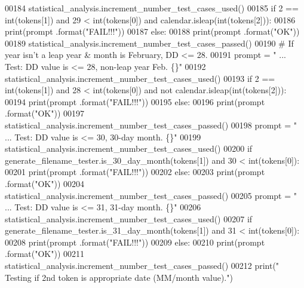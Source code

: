 \begin{DoxyCode}
00184         statistical\_analysis.increment\_number\_test\_cases\_used()
00185         \textcolor{keywordflow}{if} 2 == int(tokens[1]) \textcolor{keywordflow}{and} 29 < int(tokens[0]) \textcolor{keywordflow}{and} calendar.isleap(int(tokens[2])):
00186             print(prompt .format(\textcolor{stringliteral}{"FAIL!!!"}))
00187         \textcolor{keywordflow}{else}:
00188             print(prompt .format(\textcolor{stringliteral}{"OK"}))
00189             statistical\_analysis.increment\_number\_test\_cases\_passed()
00190         \textcolor{comment}{# If year isn't a leap year & month is February, DD <= 28.}
00191         prompt = \textcolor{stringliteral}{"  ... Test: DD value is <= 28, non-leap year Feb.     \{\}"}
00192         statistical\_analysis.increment\_number\_test\_cases\_used()
00193         \textcolor{keywordflow}{if} 2 == int(tokens[1]) \textcolor{keywordflow}{and} 28 < int(tokens[0]) \textcolor{keywordflow}{and} \textcolor{keywordflow}{not} calendar.isleap(int(tokens[2])):
00194             print(prompt .format(\textcolor{stringliteral}{"FAIL!!!"}))
00195         \textcolor{keywordflow}{else}:
00196             print(prompt .format(\textcolor{stringliteral}{"OK"}))
00197             statistical\_analysis.increment\_number\_test\_cases\_passed()
00198         prompt = \textcolor{stringliteral}{"  ... Test: DD value is <= 30, 30-day month.      \{\}"}
00199         statistical\_analysis.increment\_number\_test\_cases\_used()
00200         \textcolor{keywordflow}{if} generate\_filename\_tester.is\_30\_day\_month(tokens[1]) \textcolor{keywordflow}{and} 30 < int(tokens[0]):
00201             print(prompt .format(\textcolor{stringliteral}{"FAIL!!!"}))
00202         \textcolor{keywordflow}{else}:
00203             print(prompt .format(\textcolor{stringliteral}{"OK"}))
00204             statistical\_analysis.increment\_number\_test\_cases\_passed()
00205         prompt = \textcolor{stringliteral}{"  ... Test: DD value is <= 31, 31-day month.      \{\}"}
00206         statistical\_analysis.increment\_number\_test\_cases\_used()
00207         \textcolor{keywordflow}{if} generate\_filename\_tester.is\_31\_day\_month(tokens[1]) \textcolor{keywordflow}{and} 31 < int(tokens[0]):
00208             print(prompt .format(\textcolor{stringliteral}{"FAIL!!!"}))
00209         \textcolor{keywordflow}{else}:
00210             print(prompt .format(\textcolor{stringliteral}{"OK"}))
00211             statistical\_analysis.increment\_number\_test\_cases\_passed()
00212         print(\textcolor{stringliteral}{" Testing if 2nd token is appropriate date (MM/month value)."})

\end{DoxyCode}
